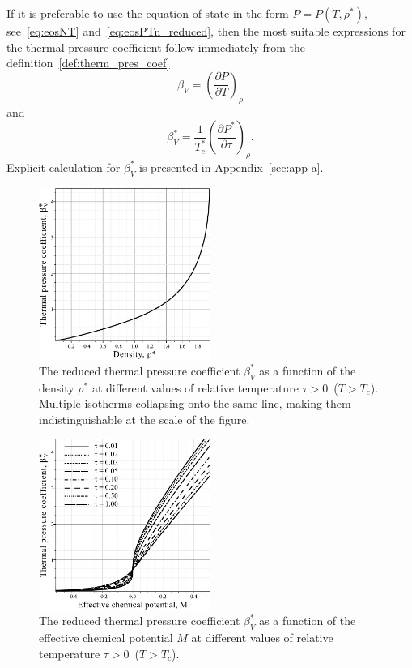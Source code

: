 If it is preferable to use the equation of state in the form $P=P(T, \rho^*)$, see~\eqref{eq:eosNT} and~\eqref{eq:eosPTn_reduced}, then the most suitable expressions for the thermal pressure coefficient follow immediately from the definition~\eqref{def:therm_pres_coef}
\begin{equation}
	\beta_V = \left(\frac{\partial P}{\partial T}\right)_\rho
\end{equation}
and
\begin{equation}
	\label{eq:beta_star_n}
	\beta^*_V = \frac{1}{T^*_c} \left(\frac{\partial P^*}{\partial \tau}\right)_{\rho}.
\end{equation}
Explicit calculation for $\beta^*_V$ is presented in Appendix~\ref{sec:app-a}.

\begin{figure}[h!]
	\centering \includegraphics[width=0.5\textwidth]{f3a.pdf}
	\vskip-3mm\caption{The reduced thermal pressure coefficient $\beta^*_V$ as a function of the density $\rho^*$ at different values of relative temperature $\tau > 0$~($T > T_c$). Multiple isotherms collapsing onto the same line, making them indistinguishable at the scale of the figure.
	}\label{fig3a}
\end{figure}
\begin{figure}[h!]
	\centering \includegraphics[width=0.5\textwidth]{f3b.pdf}
	\vskip-3mm\caption{The reduced thermal pressure coefficient $\beta^*_V$ as a function of the effective chemical potential $M$ at different values of relative temperature $\tau > 0$~($T > T_c$). 
	}\label{fig3b}
\end{figure}
